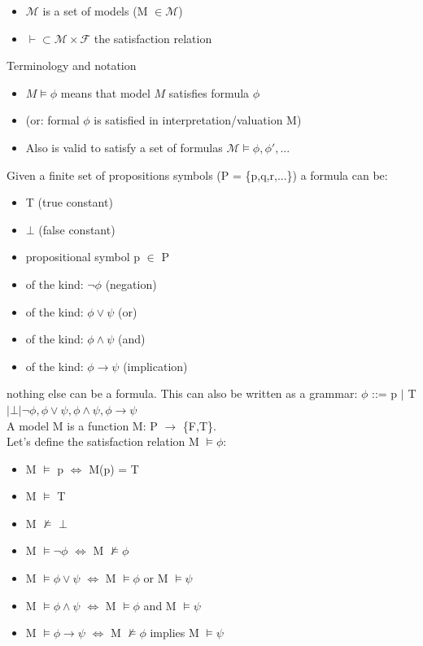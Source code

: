\documentclass[12pt]{article}
\begin{document}
\begin{itemize}
    \item $\mathcal{M}$ is a set of models (M $\in \mathcal{M}$)
    \item $\vdash \subset \mathcal{M} \times \mathcal{F}$ the satisfaction relation
\end{itemize}
Terminology and notation
\begin{itemize}
    \item $M \models \phi$ means that model $M$ satisfies formula $\phi$
    \item (or: formal $\phi$ is satisfied in interpretation/valuation M)
    \item Also is valid to satisfy a set of formulas $\mathcal{M} \models \phi, \phi',...$
\end{itemize}
Given a finite set of propositions symbols (P = \{p,q,r,...\}) a formula can be: 
\begin{itemize}
    \item T (true constant)
    \item $\bot$ (false constant)
    \item propositional symbol p $\in$ P
    \item of the kind: $\neg \phi$ (negation)
    \item of the kind: $\phi \lor \psi$ (or)
    \item of the kind: $\phi \land \psi$ (and)
    \item of the kind: $\phi \rightarrow \psi$ (implication)
\end{itemize}
nothing else can be a formula. This can also be written as a grammar: $\phi$ ::= p $|$ T $| \bot |
\neg \phi,
\phi \lor \psi,
\phi \land \psi,
\phi \rightarrow \psi $
\\ A model M is a function M: P $\rightarrow$ \{F,T\}.
\\ Let's define the satisfaction relation M $\models \phi$:
\begin{itemize}
    \item M $\models$ p $\Longleftrightarrow$ M(p) = T
    \item M $\models$ T
    \item M $\not\models$ $\bot$
    \item M $\models \neg \phi$ $\Longleftrightarrow$ M $\not\models \phi$
    \item M $\models \phi \lor \psi$ $\Longleftrightarrow$ M $\models \phi$ or M $\models \psi$
    \item M $\models \phi \land \psi$ $\Longleftrightarrow$ M $\models \phi$ and M $\models \psi$
    \item M $\models \phi \rightarrow \psi$ $\Longleftrightarrow$ M $\not\models \phi$ implies M $\models \psi$
\end{itemize}
\end{document}
